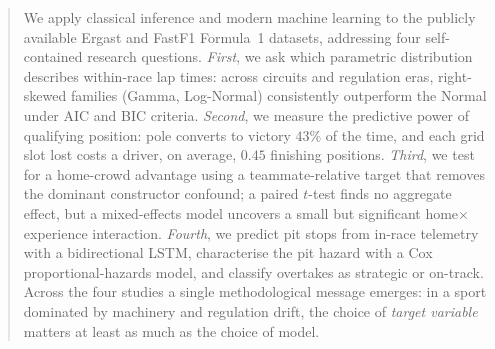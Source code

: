 \documentclass[11pt,a4paper]{article}
\theoremstyle{remark}
\begin{document}
\begin{abstract}
\noindent
We apply classical inference and modern machine learning to the
publicly available Ergast and FastF1 Formula~1 datasets, addressing four
self-contained research questions. \emph{First}, we ask which parametric
distribution describes within-race lap times: across circuits and
regulation eras, right-skewed families (Gamma, Log-Normal) consistently
outperform the Normal under AIC and BIC criteria.
\emph{Second}, we measure the predictive power of qualifying position:
pole converts to victory $43\%$ of the time, and each grid slot lost
costs a driver, on average, $0.45$ finishing positions. \emph{Third}, we
test for a home-crowd advantage using a teammate-relative target that
removes the dominant constructor confound; a paired $t$-test finds no
aggregate effect, but a mixed-effects model uncovers a small but
significant home${\times}$experience interaction. \emph{Fourth}, we
predict pit stops from in-race telemetry with a bidirectional LSTM,
characterise the pit hazard with a Cox proportional-hazards model, and
classify overtakes as strategic or on-track. Across the four studies a
single methodological message emerges: in a sport dominated by
machinery and regulation drift, the choice of \emph{target variable}
matters at least as much as the choice of model.
\end{abstract}

\tableofcontents
\vspace{1em}
\end{document}
